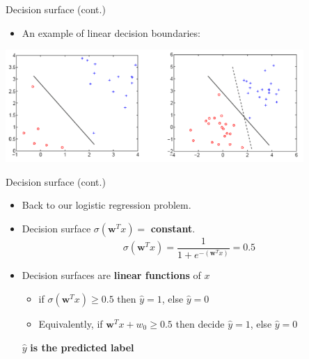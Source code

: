 \documentclass[serif, aspectratio=169]{beamer}
\begin{document}
    \begin{frame}{Decision surface (cont.)}

        \begin{itemize}
            \item An example of linear decision boundaries:
        \end{itemize}
        \begin{center}
            \includegraphics[width=0.85\textwidth]{pic/DBoundary.png}
        \end{center}
    \end{frame}

    \begin{frame}{Decision surface (cont.)}
        \begin{itemize}
            \item Back to our logistic regression problem.
            \item Decision surface $\sigma (\mathbf{w}^Tx) = $ \textbf{constant}.
            \[
                \sigma (\mathbf{w}^Tx) = \frac{1}{1 + e^{-(\mathbf{w}^Tx)}} = 0.5
            \]
            \item Decision surfaces are \textbf{linear functions} of $x$
            \begin{itemize}
                \item if $\sigma (\mathbf{w}^Tx) \geq 0.5$ then $\hat{y}=1$, else $\hat{y} = 0$
                \item Equivalently, if $\mathbf{w}^Tx + w_0 \geq 0.5$ then decide $\hat{y}=1$, else $\hat{y}=0$
            \end{itemize}%
            \vfill
            \begin{center}
                \( \hat{y} \) \textbf{is the predicted label}
            \end{center}
        \end{itemize}
    \end{frame}
\end{document}
